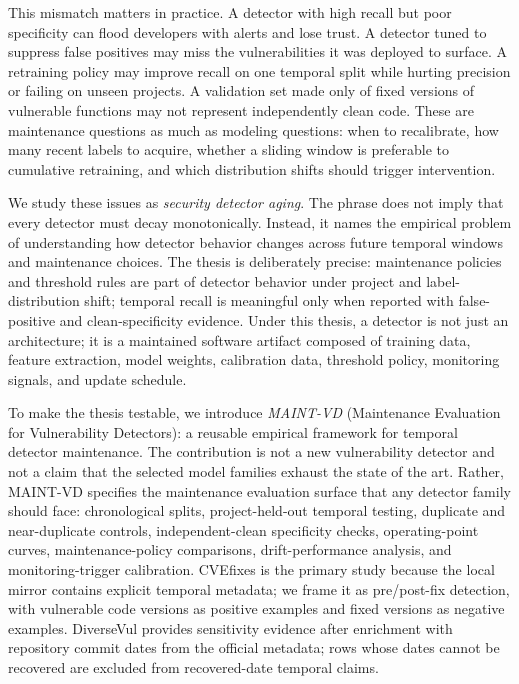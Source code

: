 \documentclass[a4paper,fleqn]{cas-dc}
\begin{document}
This mismatch matters in practice. A detector with high recall but poor
specificity can flood developers with alerts and lose trust. A detector tuned
to suppress false positives may miss the vulnerabilities it was deployed to
surface. A retraining policy may improve recall on one temporal split while
hurting precision or failing on unseen projects. A validation set made only of
fixed versions of vulnerable functions may not represent independently clean
code. These are maintenance questions as much as modeling questions: when to
recalibrate, how many recent labels to acquire, whether a sliding window is
preferable to cumulative retraining, and which distribution shifts should
trigger intervention.

We study these issues as \emph{security detector aging}. The phrase
does not imply that every detector must decay monotonically. Instead, it names
the empirical problem of understanding how detector behavior changes across
future temporal windows and maintenance choices. The thesis is deliberately
precise: maintenance policies and threshold rules are part of detector behavior
under project and label-distribution shift; temporal recall is meaningful only
when reported with false-positive and clean-specificity evidence.
Under this thesis, a detector is not just an
architecture; it is a maintained software artifact composed of training data,
feature extraction, model weights, calibration data, threshold policy,
monitoring signals, and update schedule.

To make the thesis testable, we introduce \emph{MAINT-VD} (Maintenance
Evaluation for Vulnerability Detectors): a reusable empirical framework for
temporal detector maintenance. The contribution is not a
new vulnerability detector and not a claim that the selected model families
exhaust the state of the art. Rather, MAINT-VD specifies the maintenance
evaluation surface that any detector family should face: chronological splits,
project-held-out temporal testing, duplicate and near-duplicate controls,
independent-clean specificity checks, operating-point curves,
maintenance-policy comparisons, drift-performance analysis, and
monitoring-trigger calibration. CVEfixes is the primary study because the
local mirror contains explicit temporal metadata; we frame it as pre/post-fix
detection, with vulnerable code versions as positive examples and fixed
versions as negative examples. DiverseVul provides sensitivity evidence after
enrichment with repository commit dates from the official metadata; rows whose
dates cannot be recovered are excluded from recovered-date temporal claims.
\end{document}
